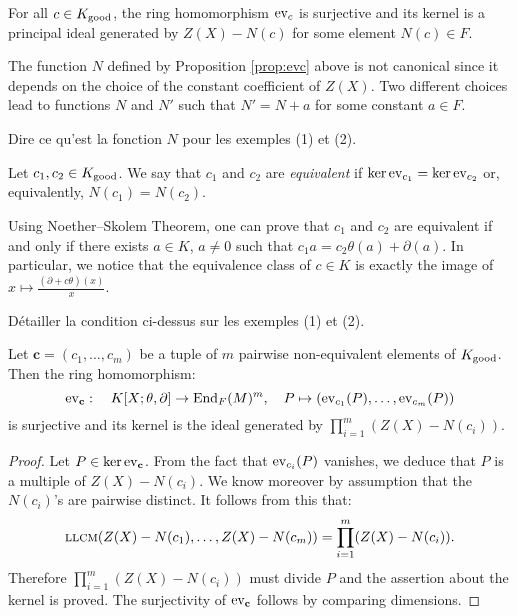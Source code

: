 \documentclass[a4paper]{llncs}
\def\todo#1{{\color{todo} #1}}
\newcommand{\End}{\textrm{\rm End}}
\newcommand{\ev}[1]{\textrm{\rm ev}_{#1}}
\newcommand{\llcm}{\textsc{llcm}}
\newcommand{\bc}{\textbf{c}}
\newcommand{\good}{\textrm{\rm good}}
\begin{document}
\begin{proposition}
\label{prop:evc}
For all $c \in K_\good$, the ring homomorphism $\ev{c}$ is surjective
and its kernel is a principal ideal generated by $Z(X) - N(c)$
for some element $N(c) \in F$.
\end{proposition}

\begin{remark}
The function $N$ defined by Proposition \ref{prop:evc} above is not 
canonical since it depends on the choice of the constant coefficient 
of $Z(X)$. Two different choices lead to functions $N$ and $N'$ such
that $N' = N + a$ for some constant $a \in F$.
\end{remark}

\todo{Dire ce qu'est la fonction $N$ pour les exemples (1) et (2).}

\begin{definition}
\label{def:equiv}
Let $c_1, c_2 \in K_\good$.
We say that $c_1$ and $c_2$ are \emph{equivalent} if
$\ker \ev{c_1} = \ker \ev{c_2}$ or, equivalently, $N(c_1) = N(c_2)$.
\end{definition}

Using Noether--Skolem Theorem, one can prove that $c_1$ and $c_2$ are 
equivalent if and only if there exists $a \in K$, $a \neq 0$ such that 
$c_1 a = c_2 \theta(a) + \partial(a)$. In particular, we notice that the 
equivalence class of $c \in K$ is exactly the image of $x \mapsto 
\frac{(\partial + c\theta)(x)} x$.

\todo{Détailler la condition ci-dessus sur les exemples (1) et (2).}

\begin{proposition}
\label{prop:evbc}
Let $\bc = (c_1, \ldots, c_m)$ be a tuple of $m$ pairwise non-equivalent 
elements of $K_\good$.
Then the ring homomorphism:
$$\ev \bc : \quad K[X;\theta,\partial] \to \End_F(M)^m, \quad
P \mapsto (\ev{c_1}(P), \ldots, \ev{c_m}(P))$$
is surjective and its kernel is the ideal generated by
$\prod_{i=1}^m (Z(X) - N(c_i))$.
\end{proposition}

\begin{proof}
Let $P \in \ker \ev\bc$. From the fact that $\ev{c_i}(P)$ vanishes,
we deduce that $P$ is a multiple of $Z(X) - N(c_i)$. We know moreover
by assumption that the $N(c_i)$'s are pairwise distinct. It follows
from this that:
$$\llcm(Z(X)-N(c_1), \ldots, Z(X)-N(c_m)) = 
\prod_{i=1}^m (Z(X) - N(c_i)).$$
Therefore $\prod_{i=1}^m (Z(X) - N(c_i))$ must divide $P$ and the
assertion about the kernel is proved. The surjectivity of $\ev\bc$
follows by comparing dimensions.
\end{proof}
\end{document}
